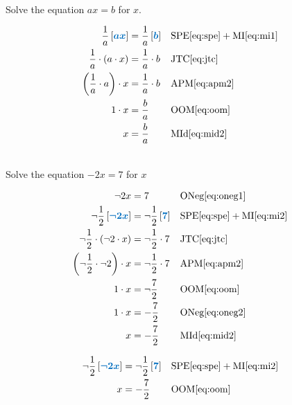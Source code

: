 \documentclass[20150903-160354-rs2.2-MarksMathNotebook.tex]{subfiles}
\begin{document}
\begin{example}[id:20141206-104404] \label{20141206-104404} \hfill \\

Solve the equation $ax=b$ for $x$.

\soln

\solnsteps
\begin{align*}
\dfrac{1}{a}\farg{ax} &= \dfrac{1}{a}\farg{b} && \text{SPE} \eqref{eq:spe} + \text{MI} \eqref{eq:mi1} \\
\dfrac{1}{a} \cdot \left( a \cdot x \right) &= \dfrac{1}{a} \cdot b && \text{JTC} \eqref{eq:jtc} \\
\left(\dfrac{1}{a} \cdot a \right) \cdot x &= \dfrac{1}{a} \cdot b  && \text{APM} \eqref{eq:apm2} \\
1\cdot x &= \dfrac{b}{a}  && \text{OOM} \eqref{eq:oom} \\
x &= \dfrac{b}{a}  && \text{MId} \eqref{eq:mid2}
\end{align*}
\end{example}

\begin{example}[id:20141206-102723] \label{20141206-102723} \hfill \\

Solve the equation $-2x=7$ for $x$

\soln

\solnsteps
\begin{align*}
\neg 2x &= 7  && \text{ONeg} \eqref{eq:oneg1} \\
\neg \dfrac{1}{2}\farg{\neg 2x}  &= \neg \dfrac{1}{2}\farg{7} && \text{SPE} \eqref{eq:spe} + \text{MI} \eqref{eq:mi2} \\
\neg \dfrac{1}{2} \cdot \left( \neg 2 \cdot x \right) &= \neg \dfrac{1}{2} \cdot 7 && \text{JTC} \eqref{eq:jtc} \\
\left(\neg\dfrac{1}{2} \cdot \neg 2 \right) \cdot x &= \neg \dfrac{1}{2} \cdot 7  && \text{APM} \eqref{eq:apm2} \\
1\cdot x &= \neg \dfrac{7}{2}  && \text{OOM} \eqref{eq:oom} \\
1\cdot x &= -\dfrac{7}{2}  && \text{ONeg} \eqref{eq:oneg2} \\
x &= -\dfrac{7}{2}  && \text{MId} \eqref{eq:mid2}
\end{align*}

\soln

\lesssteps
\begin{align*}
\neg \dfrac{1}{2}\farg{\neg 2x}  &= \neg \dfrac{1}{2}\farg{7} && \text{SPE} \eqref{eq:spe} + \text{MI} \eqref{eq:mi2} \\
x &= -\dfrac{7}{2}  && \text{OOM} \eqref{eq:oom}
\end{align*}
\end{example}
\end{document}
